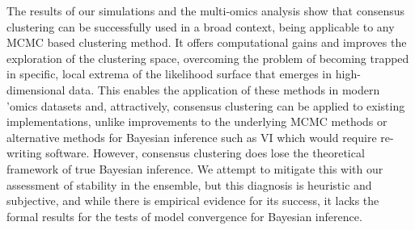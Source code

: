 \documentclass{bmcart}
\begin{document}

The results of our simulations and the multi-omics analysis show that consensus clustering can be successfully used in a broad context, being applicable to any MCMC based clustering method. It offers computational gains and improves the exploration of the clustering space, overcoming the problem of becoming trapped in specific, local extrema of the likelihood surface that emerges in high-dimensional data. This enables the application of these methods in modern 'omics datasets and, attractively, consensus clustering can be applied to existing implementations, unlike improvements to the underlying MCMC methods or alternative methods for Bayesian inference such as VI which would require re-writing software. However, consensus clustering does lose the theoretical framework of true Bayesian inference. We attempt to mitigate this with our assessment of stability in the ensemble, but this diagnosis is heuristic and subjective, and while there is empirical evidence for its success, it lacks the formal results for the tests of model convergence for Bayesian inference.



\end{document}
